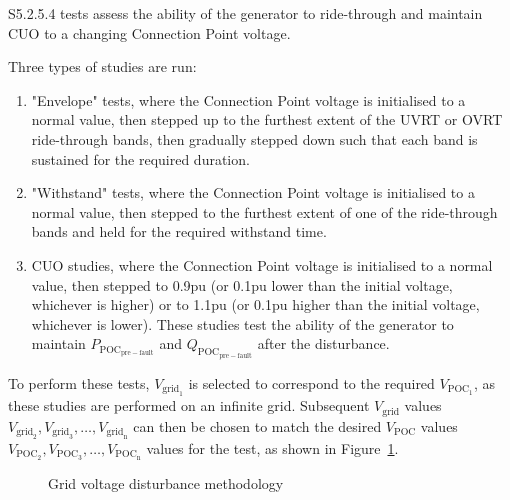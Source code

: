 S5.2.5.4 tests assess the ability of the generator to ride-through and maintain \ac{CUO} to a changing Connection Point voltage.

Three types of studies are run:

\begin{enumerate}
	\item "Envelope" tests, where the Connection Point voltage is initialised to a normal value, then stepped up to the furthest extent of the \ac{UVRT} or \ac{OVRT} ride-through bands, then gradually stepped down such that each band is sustained for the required duration. 
	\item "Withstand" tests, where the Connection Point voltage is initialised to a normal value, then stepped to the furthest extent of one of the ride-through bands and held for the required withstand time.
	\item \ac{CUO} studies, where the Connection Point voltage is initialised to a normal value, then stepped to 0.9pu (or 0.1pu lower than the initial voltage, whichever is higher) or to 1.1pu (or 0.1pu higher than the initial voltage, whichever is lower). These studies test the ability of the generator to maintain $P_{\mathrm{POC}_{\mathrm{pre-fault}}}$ and $Q_{\mathrm{POC}_{\mathrm{pre-fault}}}$ after the disturbance.
\end{enumerate}

To perform these tests, $V_{\mathrm{grid}_{\mathrm{1}}}$ is selected to correspond to the required $V_{\mathrm{POC}_{\mathrm{1}}}$, as these studies are performed on an infinite grid. Subsequent $V_{\mathrm{grid}}$ values $V_{\mathrm{grid}_{\mathrm{2}}}, V_{\mathrm{grid}_{\mathrm{3}}}, \dots, V_{\mathrm{grid}_{\mathrm{n}}}$ can then be chosen to match the desired $V_{\mathrm{POC}}$ values $V_{\mathrm{POC}_{\mathrm{2}}}, V_{\mathrm{POC}_{\mathrm{3}}}, \dots, V_{\mathrm{POC}_{\mathrm{n}}}$ values for the test, as shown in Figure~\ref{fig:s5254-assessment-methodology}.

\begin{figure}[H]
	\centering
	
	\caption{Grid voltage disturbance methodology}
	\label{fig:s5254-assessment-methodology}
\end{figure}